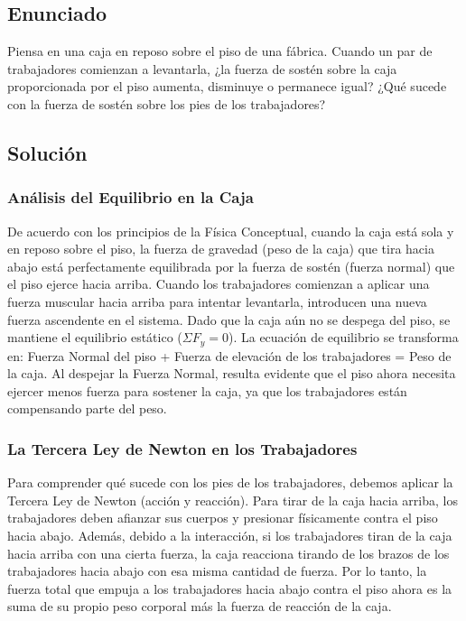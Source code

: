 \documentclass[12pt,letterpaper]{article}
\begin{document}
\newpage

\subsection*{Enunciado}
Piensa en una caja en reposo sobre el piso de una fábrica. Cuando un par de trabajadores comienzan a levantarla, ¿la fuerza de sostén sobre la caja proporcionada por el piso aumenta, disminuye o permanece igual? ¿Qué sucede con la fuerza de sostén sobre los pies de los trabajadores?

\subsection*{Solución}

\subsubsection*{Análisis del Equilibrio en la Caja}
De acuerdo con los principios de la Física Conceptual, cuando la caja está sola y en reposo sobre el piso, la fuerza de gravedad (peso de la caja) que tira hacia abajo está perfectamente equilibrada por la fuerza de sostén (fuerza normal) que el piso ejerce hacia arriba. 
Cuando los trabajadores comienzan a aplicar una fuerza muscular hacia arriba para intentar levantarla, introducen una nueva fuerza ascendente en el sistema. Dado que la caja aún no se despega del piso, se mantiene el equilibrio estático ($\Sigma F_{y} = 0$). La ecuación de equilibrio se transforma en: Fuerza Normal del piso + Fuerza de elevación de los trabajadores = Peso de la caja. 
Al despejar la Fuerza Normal, resulta evidente que el piso ahora necesita ejercer menos fuerza para sostener la caja, ya que los trabajadores están compensando parte del peso.

\subsubsection*{La Tercera Ley de Newton en los Trabajadores}
Para comprender qué sucede con los pies de los trabajadores, debemos aplicar la Tercera Ley de Newton (acción y reacción). Para tirar de la caja hacia arriba, los trabajadores deben afianzar sus cuerpos y presionar físicamente contra el piso hacia abajo. Además, debido a la interacción, si los trabajadores tiran de la caja hacia arriba con una cierta fuerza, la caja reacciona tirando de los brazos de los trabajadores hacia abajo con esa misma cantidad de fuerza.
Por lo tanto, la fuerza total que empuja a los trabajadores hacia abajo contra el piso ahora es la suma de su propio peso corporal más la fuerza de reacción de la caja.
\end{document}
